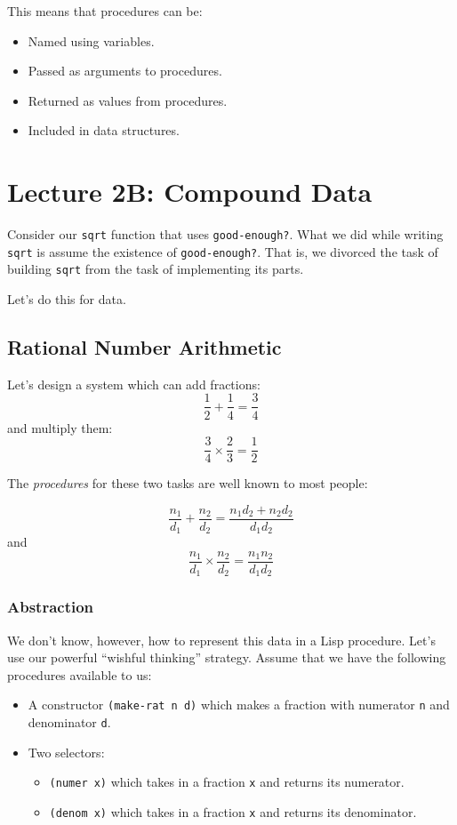 \documentclass[9pt]{report}
\begin{document}
This means that procedures can be:
\begin{itemize}
\item Named using variables.
\item Passed as arguments to procedures.
\item Returned as values from procedures.
\item Included in data structures.
\end{itemize}

\chapter{Lecture 2B: Compound Data}
\label{sec:org92a6c9b}

Consider our \texttt{sqrt} function that uses \texttt{good-enough?}. What we did
while writing \texttt{sqrt} is assume the existence of \texttt{good-enough?}.
That is, we divorced the task of building \texttt{sqrt} from the task of
implementing its parts.

Let's do this for data.

\section{Rational Number Arithmetic}
\label{sec:org3531aab}

Let's design a system which can add fractions:
$$\frac{1}{2}+\frac{1}{4}=\frac{3}{4}$$
and multiply them:
$$\frac{3}{4}\times \frac{2}{3} = \frac{1}{2}$$

The \emph{procedures} for these two tasks are well known to most people:

$$\frac{n_1}{d_1} + \frac{n_2}{d_2} = \frac{n_1d_2+n_2d_2}{d_1d_2}$$
and
$$\frac{n_1}{d_1} \times \frac{n_2}{d_2} = \frac{n_1n_2}{d_1d_2}$$

\subsection{Abstraction}
\label{sec:orgcb28f9a}
We don't know, however, how to represent this data in a Lisp
procedure. Let's use our powerful ``wishful thinking'' strategy.
Assume that we have the following procedures available to us:

\begin{itemize}
\item A constructor \texttt{(make-rat n d)} which makes a fraction with
numerator \texttt{n} and denominator \texttt{d}.
\item Two selectors:
\begin{itemize}
\item \texttt{(numer x)} which takes in a fraction \texttt{x} and returns its
numerator.
\item \texttt{(denom x)} which takes in a fraction \texttt{x} and returns its
denominator.
\end{itemize}
\end{itemize}
\end{document}
